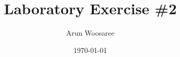 \documentclass[letterpaper]{article}
\author{Arun Woosaree}
\date{\today}
\title{Laboratory Exercise \#2}
\begin{document}
\maketitle
\begin{center}

\end{center}


\begin{center}

\end{center}
\end{document}
